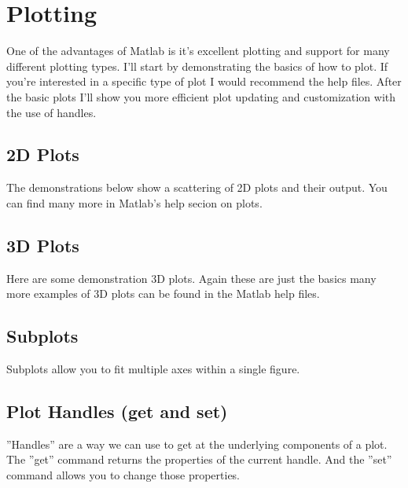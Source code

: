 
\pagebreak
\section{Plotting}
One of the advantages of Matlab is it's excellent plotting and support for many different plotting types.
 I'll start by demonstrating the basics of how to plot.
 If you're interested in a specific type of plot I would recommend the help files.
 After the basic plots I'll show you more efficient plot updating and customization with the use of handles.

\subsection{2D Plots}
The demonstrations below show a scattering of 2D plots and their output.
 You can find many more in Matlab's help secion on plots.

\begin{quote}

\end{quote}

\pagebreak
\subsection{3D Plots}
Here are some demonstration 3D plots.
 Again these are just the basics many more examples of 3D plots can be found in the Matlab help files.

\begin{quote}
 
\end{quote}

\pagebreak
\subsection{Subplots}
Subplots allow you to fit multiple axes within a single figure.

\begin{quote}
 
\end{quote}

\pagebreak
\subsection{Plot Handles (get and set)}
''Handles'' are a way we can use to get at the underlying components of a plot.
 The ''get'' command returns the properties of the current handle.
 And the ''set'' command allows you to change those properties.

